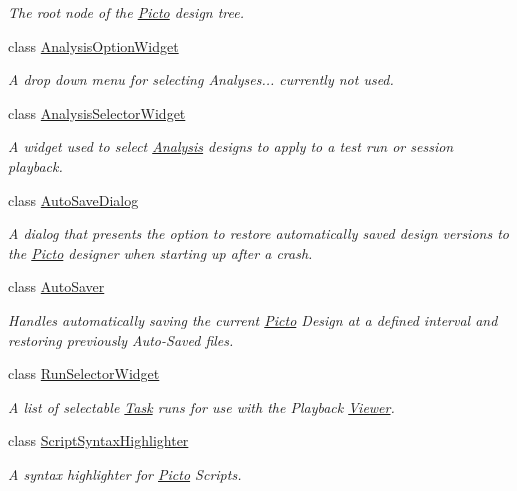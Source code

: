 \begin{DoxyCompactItemize}
\begin{DoxyCompactList}\small\item\em The root node of the \hyperlink{namespace_picto}{Picto} design tree. \end{DoxyCompactList}\item 
class \hyperlink{class_picto_1_1_analysis_option_widget}{Analysis\-Option\-Widget}
\begin{DoxyCompactList}\small\item\em A drop down menu for selecting Analyses... currently not used. \end{DoxyCompactList}\item 
class \hyperlink{class_picto_1_1_analysis_selector_widget}{Analysis\-Selector\-Widget}
\begin{DoxyCompactList}\small\item\em A widget used to select \hyperlink{class_picto_1_1_analysis}{Analysis} designs to apply to a test run or session playback. \end{DoxyCompactList}\item 
class \hyperlink{class_picto_1_1_auto_save_dialog}{Auto\-Save\-Dialog}
\begin{DoxyCompactList}\small\item\em A dialog that presents the option to restore automatically saved design versions to the \hyperlink{namespace_picto}{Picto} designer when starting up after a crash. \end{DoxyCompactList}\item 
class \hyperlink{class_picto_1_1_auto_saver}{Auto\-Saver}
\begin{DoxyCompactList}\small\item\em Handles automatically saving the current \hyperlink{namespace_picto}{Picto} Design at a defined interval and restoring previously Auto-\/\-Saved files. \end{DoxyCompactList}\item 
class \hyperlink{class_picto_1_1_run_selector_widget}{Run\-Selector\-Widget}
\begin{DoxyCompactList}\small\item\em A list of selectable \hyperlink{class_picto_1_1_task}{Task} runs for use with the Playback \hyperlink{class_viewer}{Viewer}. \end{DoxyCompactList}\item 
class \hyperlink{class_picto_1_1_script_syntax_highlighter}{Script\-Syntax\-Highlighter}
\begin{DoxyCompactList}\small\item\em A syntax highlighter for \hyperlink{namespace_picto}{Picto} Scripts. \end{DoxyCompactList}\item 

\end{DoxyCompactItemize}
